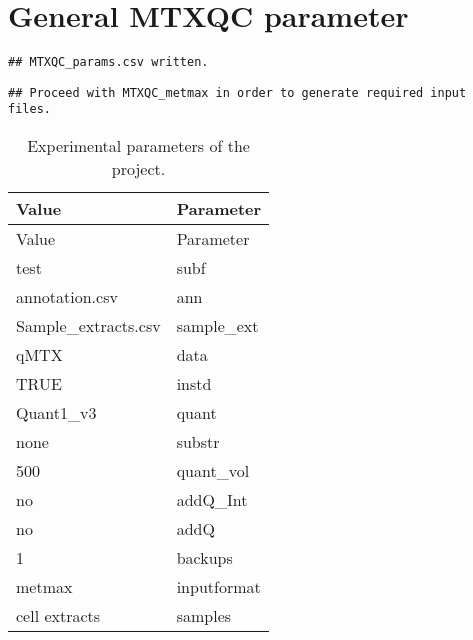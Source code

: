 \documentclass[10pt,]{article}
\begin{document}
\section{General MTXQC parameter}\label{general-mtxqc-parameter}

\begin{verbatim}
## MTXQC_params.csv written.
\end{verbatim}

\begin{verbatim}
## Proceed with MTXQC_metmax in order to generate required input files.
\end{verbatim}

\begin{longtable}[]{@{}ll@{}}
\caption{Experimental parameters of the project.}\tabularnewline
\toprule
Value & Parameter\tabularnewline
\midrule
\endfirsthead
\toprule
Value & Parameter\tabularnewline
\midrule
\endhead
test & subf\tabularnewline
annotation.csv & ann\tabularnewline
Sample\_extracts.csv & sample\_ext\tabularnewline
qMTX & data\tabularnewline
TRUE & instd\tabularnewline
Quant1\_v3 & quant\tabularnewline
none & substr\tabularnewline
500 & quant\_vol\tabularnewline
no & addQ\_Int\tabularnewline
no & addQ\tabularnewline
1 & backups\tabularnewline
metmax & inputformat\tabularnewline
cell extracts & samples\tabularnewline
\bottomrule
\end{longtable}
\newpage
\singlespacing 
\end{document}
